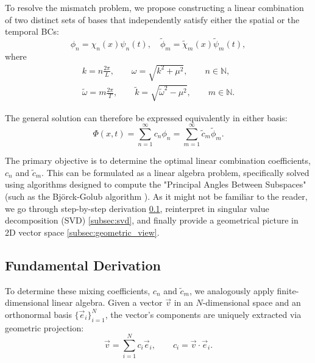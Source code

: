 To resolve the mismatch problem, we propose constructing a linear combination of two distinct sets of bases that independently satisfy either the spatial or the temporal BCs:
\begin{equation}
    \phi_n = \chi_n(x)\psi_n(t), \quad \tilde\phi_m = \tilde\chi_m(x)\tilde\psi_m(t),
\end{equation}
where
\begin{equation}
\begin{aligned}
    k = n\frac{2\pi}{L}, \qquad \omega = \sqrt{k^2 + \mu^2}, \qquad n \in \mathbb{N}, \\
    \tilde\omega = m\frac{2\pi}{T}, \qquad \tilde{k} = \sqrt{\tilde{\omega}^2 - \mu^2}, \qquad m \in \mathbb{N}.
\end{aligned}
\end{equation}

The general solution can therefore be expressed equivalently in either basis:
\begin{equation}\label{eq:linear_combination}
    \Phi(x,t) = \sum_{n=1}^\infty c_n \phi_n = \sum_{m=1}^\infty \tilde{c}_m \tilde{\phi}_m.
\end{equation}

The primary objective is to determine the optimal linear combination coefficients, \(c_n\) and \(\tilde{c}_m\). This can be formulated as a linear algebra problem, specifically solved using algorithms designed to compute the "Principal Angles Between Subspaces" (such as the Björck-Golub algorithm \cite{1973MaCom..27..579B}). As it might not be familiar to the reader, we go through step-by-step derivation \cref{subsec:basic_derivation}, reinterpret in singular value decomposition (SVD) \cref{subsec:svd}, and finally provide a geometrical picture in 2D vector space \cref{subsec:geometric_view}. 

\subsection{Fundamental Derivation}\label{subsec:basic_derivation}

To determine these mixing coefficients, \(c_n\) and \(\tilde{c}_m\), we analogously apply finite-dimensional linear algebra. Given a vector \(\vec{v}\) in an \(N\)-dimensional space and an orthonormal basis \(\{ \vec{e}_i \}_{i=1}^N\), the vector's components are uniquely extracted via geometric projection:
\begin{equation}
    \vec{v} = \sum_{i=1}^N c_i \vec{e}_i, \qquad c_i = \vec{v} \cdot \vec{e}_i.
\end{equation}

